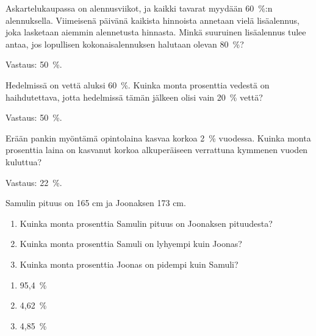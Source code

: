\begin{tehtava}
    Askartelukaupassa on alennusviikot, ja kaikki tavarat myydään 60~\%:n 
    alennuksella. Viimeisenä päivänä kaikista hinnoista annetaan vielä 
    lisäalennus, joka lasketaan aiemmin alennetusta hinnasta. Minkä suuruinen 
    lisäalennus tulee antaa, jos lopullisen kokonaisalennuksen halutaan olevan 80~\%?
    \begin{vastaus}
        Vastaus: 50~\%.
    \end{vastaus}
\end{tehtava}

\begin{tehtava}
	Hedelmissä on vettä aluksi 60~\%. Kuinka monta prosenttia vedestä on 
	haihdutettava, jotta hedelmissä tämän jälkeen olisi vain 20~\% vettä?
	\begin{vastaus}
		Vastaus: 50~\%.
	\end{vastaus}
\end{tehtava}
\begin{tehtava}
    Erään pankin myöntämä opintolaina kasvaa korkoa 2~\% vuodessa. Kuinka monta 
    prosenttia laina on kasvanut korkoa alkuperäiseen verrattuna kymmenen vuoden kuluttua?
    \begin{vastaus}
        Vastaus: 22~\%.
    \end{vastaus}
\end{tehtava}

\begin{tehtava}

Samulin pituus on 165 cm ja Joonaksen 173 cm.
\begin{enumerate}
\item Kuinka monta prosenttia Samulin pituus on Joonaksen pituudesta?
\item Kuinka monta prosenttia Samuli on lyhyempi kuin Joonas?
\item Kuinka monta prosenttia Joonas on pidempi kuin Samuli?
\end{enumerate}

\begin{vastaus}
\begin{enumerate}
\item 95,4~\%
\item 4,62~\%
\item 4,85~\%
\end{enumerate}
\end{vastaus}

\end{tehtava}

